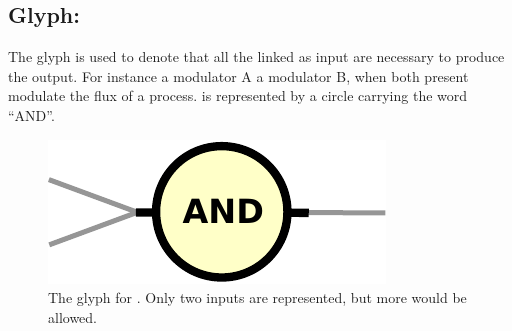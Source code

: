 \subsection{Glyph: }\label{sec:and}

The glyph  is used to denote that all the  linked as input are necessary to produce the output. For instance a modulator A  a modulator B, when both present modulate the flux of a process.  is represented by a circle carrying the word ``AND''.

\begin{figure}[H]
  \centering
  \includegraphics[scale = 0.5]{images/and}
  \caption{The \PD glyph for . Only two inputs are represented, but more would be allowed.}
  \label{fig:and}
\end{figure}
